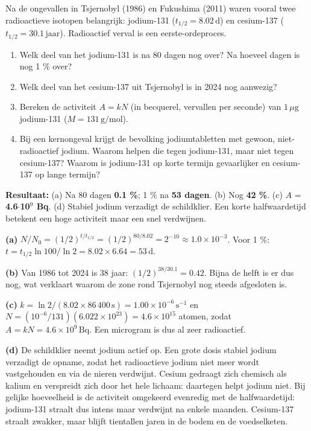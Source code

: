\begin{oefening}
Na de ongevallen in Tsjernobyl (1986) en Fukushima (2011) waren vooral twee radioactieve isotopen belangrijk: jodium-131 (\(t_{1/2} = 8.02\,\mathrm{d}\)) en cesium-137 (\(t_{1/2} = 30.1\,\mathrm{jaar}\)). Radioactief verval is een eerste-ordeproces.

\begin{enumerate}
\item[(a)]
  Welk deel van het jodium-131 is na 80 dagen nog over? Na hoeveel dagen is nog 1 \% over?
\item[(b)]
  Welk deel van het cesium-137 uit Tsjernobyl is in 2024 nog aanwezig?
\item[(c)]
  Bereken de activiteit \(A = kN\) (in becquerel, vervallen per seconde) van \(1\,\mu\mathrm{g}\) jodium-131 (\(M = 131\,\mathrm{g/mol}\)).
\item[(d)]
  Bij een kernongeval krijgt de bevolking jodiumtabletten met gewoon, niet-radioactief jodium. Waarom helpen die tegen jodium-131, maar niet tegen cesium-137? Waarom is jodium-131 op korte termijn gevaarlijker en cesium-137 op lange termijn?
\end{enumerate}
\end{oefening}
\begin{oplossing}
\textbf{Resultaat:} (a) Na 80 dagen \textbf{0.1 \%}; 1 \% na \textbf{53 dagen}. (b) Nog \textbf{42 \%}. (c) \(A\) = \textbf{4.6\ensuremath{\cdot{}}10\ensuremath{^{9}} Bq}. (d) Stabiel jodium verzadigt de schildklier. Een korte halfwaardetijd betekent een hoge activiteit maar een snel verdwijnen.

\textbf{(a)} \(N/N_0 = (1/2)^{t/t_{1/2}} = (1/2)^{80/8.02} = 2^{-10} \approx 1.0\times10^{-3}\). Voor 1 \%: \(t = t_{1/2}\ln 100/\ln 2 = 8.02 \times 6.64 = 53\,\mathrm{d}\).

\textbf{(b)} Van 1986 tot 2024 is 38 jaar: \((1/2)^{38/30.1} = 0.42\). Bijna de helft is er dus nog, wat verklaart waarom de zone rond Tsjernobyl nog steeds afgesloten is.

\textbf{(c)} \(k = \ln 2/(8.02 \times 86\,400\,\mathrm{s}) = 1.00\times10^{-6}\,\mathrm{s^{-1}}\) en \(N = (10^{-6}/131)(6.022\times10^{23}) = 4.6\times10^{15}\) atomen, zodat \(A = kN = 4.6\times10^{9}\,\mathrm{Bq}\). Een microgram is dus al zeer radioactief.

\textbf{(d)} De schildklier neemt jodium actief op. Een grote dosis stabiel jodium verzadigt de opname, zodat het radioactieve jodium niet meer wordt vastgehouden en via de nieren verdwijnt. Cesium gedraagt zich chemisch als kalium en verspreidt zich door het hele lichaam: daartegen helpt jodium niet. Bij gelijke hoeveelheid is de activiteit omgekeerd evenredig met de halfwaardetijd: jodium-131 straalt dus intens maar verdwijnt na enkele maanden. Cesium-137 straalt zwakker, maar blijft tientallen jaren in de bodem en de voedselketen.
\end{oplossing}

